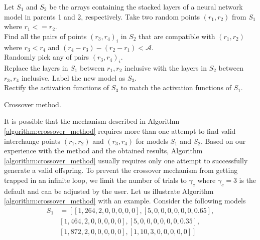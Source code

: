 \documentclass[preprint,12pt]{elsarticle}%
\begin{document}
\begin{algorithm}[H]
\SetAlgoLined
{}


\BlankLine

Let $S_1$ and $S_2$ be the arrays containing the stacked layers of a neural network model in parents 1 and 2, respectively.
Take two random points $(r_1, r_2)$ from $S_1$ where $r_1 <= r_2 $.\\
Find all the pairs of points $(r_3, r_4)_i$ in $S_2$ that are compatible with $(r_1, r_2)$ where $r_3 < r_4$ and $(r_4 - r_3) - (r_2 - r_1) < \mathcal{A}$.\\
Randomly pick any of pairs $(r_3, r_4)_i$.\\
Replace the layers in $S_1$ between $r_1, r_2$ inclusive with the layers in $S_2$ between $r_3, r_4$ inclusive. Label the new model as $S_3$.\\
Rectify the activation functions of $S_3$ to match the activation functions of $S_1$.

\caption{Crossover method.}
\label{algorithm:crossover_method}
\end{algorithm}

It is possible that the mechanism described in Algorithm \ref{algorithm:crossover_method} requires more than one attempt to find valid interchange points $(r_1, r_2)$ and  $(r_3, r_4)$ for models $S_1$ and $S_2$. Based on our experience with the method and the obtained results,  Algorithm \ref{algorithm:crossover_method} usually requires only one attempt to successfully generate a valid offspring. To prevent the crossover mechanism from getting trapped in an infinite loop, we limit the number of trials to $\gamma_c$ where $\gamma_c=3$ is the default and can be adjusted by the user. Let us illustrate Algorithm \ref{algorithm:crossover_method} with an example. Consider the following models
\begin{align*}
S_1 & = \left[ \left[1, 264, 2, 0, 0, 0, 0, 0 \right], \left[5, 0, 0, 0, 0, 0, 0, 0.65 \right], \right. \\
& \left. \left[1, 464, 2, 0, 0, 0, 0, 0 \right], \left[5, 0, 0, 0, 0, 0, 0, 0.35 \right], \right. \\
& \left. \left[1, 872, 2, 0, 0, 0, 0, 0 \right], \left[1, 10, 3, 0, 0, 0, 0, 0 \right] \right]
\end{align*}
\end{document}
